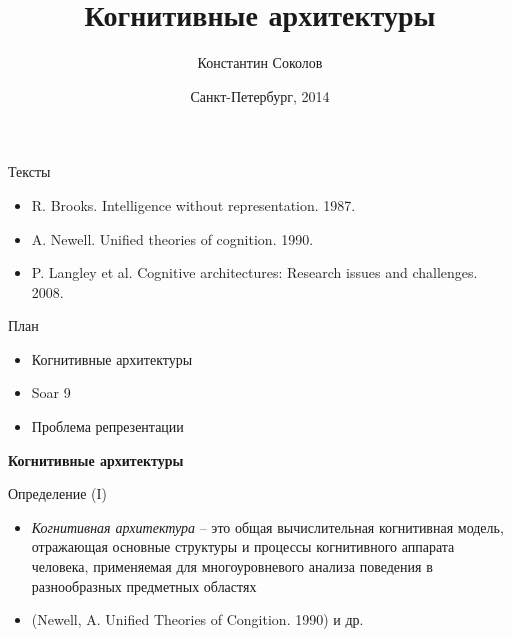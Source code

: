\documentclass{beamer}
\begin{document}
\title{\Large{Когнитивные архитектуры}}
\author{Константин Соколов}
\date{Санкт-Петербург, 2014} 
\begin{frame}
    \thispagestyle{empty}
    \titlepage
\end{frame}

\begin{frame}{Тексты}
\setcounter{framenumber}{1}
\begin{itemize}
	\item R. Brooks. Intelligence without representation. 1987.
    \medskip
    \item A. Newell. Unified theories of cognition. 1990.
    \medskip
    \item P. Langley et al. Cognitive architectures: Research issues and challenges. 2008.
\end{itemize}
\end{frame}

\begin{frame}{План}
    \begin{itemize}
        \item Когнитивные архитектуры
        \medskip
        \item Soar 9
        \medskip
        \item Проблема репрезентации
        \medskip
    \end{itemize}
\end{frame}


%
%

\begin{frame}{}
\begin{center}
	\textbf{Когнитивные архитектуры}
\end{center}
\end{frame}



\begin{frame}{Определение (I)}
\begin{itemize}
    \item[] \textit{Когнитивная архитектура} -- это общая вычислительная когнитивная модель, отражающая основные структуры и процессы когнитивного аппарата человека, применяемая для многоуровневого анализа поведения в разнообразных предметных областях
    \item[] \hfill {\small(Newell, A. Unified Theories of Congition. 1990) и др.}
\end{itemize}
\end{frame}
\end{document}
